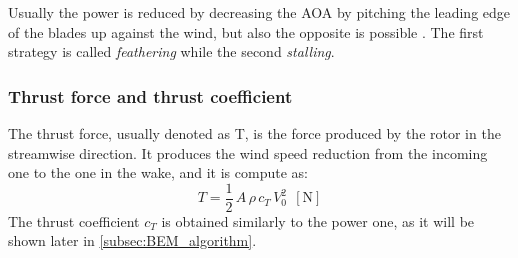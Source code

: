 Usually the power is reduced by decreasing the \acrshort{AOA} by pitching the leading edge of the blades up against the wind, but also the opposite is possible \cite{Aerodynamics_of_wind_turbines}. The first strategy is called \textit{feathering} while the second \textit{stalling}.

\subsubsection{Thrust force and thrust coefficient}
The thrust force, usually denoted as T, is the force produced by the rotor in the streamwise direction. It produces the wind speed reduction from the incoming one to the one in the wake, and it is compute as:
\begin{equation}
    T = \frac{1}{2} \, A \, \rho \, c_T \, V_0^2 \ \ \left[\si{\newton}\right]
    \label{eq:thrust_coeff}
\end{equation}
The thrust coefficient $c_T$ is obtained similarly to the power one, as it will be shown later in \autoref{subsec:BEM_algorithm}.

